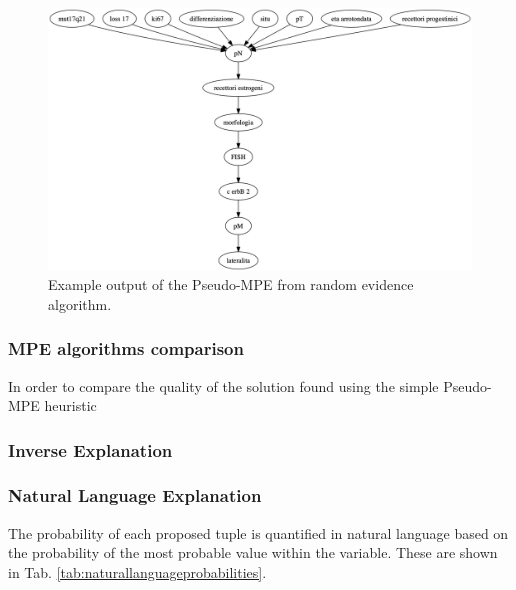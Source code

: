 \begin{figure}[htbp]
\centerline{\includegraphics[width=\columnwidth]{methodology/images/pseudo-mpe-random-example}}
\caption{Example output of the Pseudo-MPE from random evidence algorithm.}
\label{fig:pseudo-mpe-random}
\end{figure}

\subsubsection{MPE algorithms comparison}
In order to compare the quality of the solution found using the simple Pseudo-MPE heuristic

\subsubsection{Inverse Explanation}

\subsubsection{Natural Language Explanation}
The probability of each proposed tuple is quantified in natural language based on the probability of the most probable value within the variable.
These are shown in Tab. \ref{tab:naturallanguageprobabilities}.

